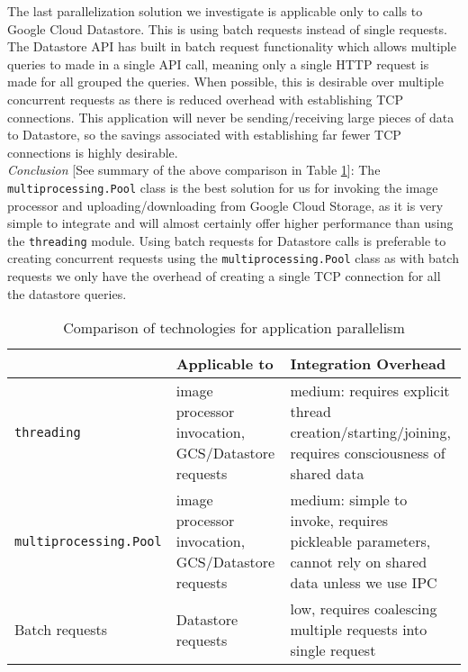 \documentclass[10pt, onecolumn, draftclsnofoot, letterpaper, compsoc]{IEEEtran}
\begin{document}
The last parallelization solution we investigate is applicable only to calls to 
Google Cloud Datastore. This is using batch requests instead of single requests. 
The Datastore API has built in batch request functionality which allows multiple 
queries to made in a single API call, meaning only a single HTTP request is made 
for all grouped the queries\cite{batches}. When possible, this is desirable over 
multiple concurrent requests as there is reduced overhead with establishing 
TCP connections. This application will never be sending/receiving large 
pieces of data to Datastore, so the savings associated with establishing 
far fewer TCP connections is highly desirable. \\

\textit{Conclusion} [See summary of the above comparison in Table \ref{table:bret3}]:
The {\tt multiprocessing.Pool} class is the best solution for us 
for invoking the image processor and uploading/downloading from Google Cloud 
Storage, as it is very simple to integrate and will almost certainly offer 
higher performance than using the {\tt threading} module. Using batch requests for 
Datastore calls is preferable to creating concurrent requests using the 
{\tt multiprocessing.Pool} class as with batch requests we only have the overhead 
of creating a single TCP connection for all the datastore queries. \\

\begin{table}[h]
\centering
\caption{Comparison of technologies for application parallelism}
\begin{tabular}{|p{4.2cm}|p{4.2cm}|p{4.2cm}|}
\cline{3-3}
\hline

 & Applicable to & Integration Overhead \\ \hline

{\tt threading} & image processor invocation, GCS/Datastore requests 
& medium: requires explicit thread creation/starting/joining, 
requires consciousness of shared data \\ \hline

{\tt multiprocessing.Pool} & image processor invocation, GCS/Datastore requests
& medium: simple to invoke, requires pickleable parameters, cannot rely 
on shared data unless we use IPC \\ \hline

Batch requests & Datastore requests & low, requires coalescing multiple 
requests into single request  \\ \hline

\end{tabular}
\label{table:bret3}
\end{table}
\end{document}

